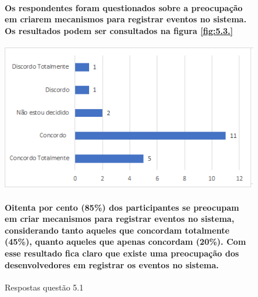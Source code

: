 \begin{figure}[!t]
\centering
\paragraph{Os respondentes foram questionados sobre a preocupação em criarem mecanismos para registrar eventos no sistema. Os resultados podem ser consultados na figura \ref{fig:5.3.}}
\includegraphics[scale=0.7]{figuras das questoes/5.1.png}
\caption{Respostas questão 5.1}
\paragraph{Oitenta por cento (85{\%}) dos participantes se preocupam em criar mecanismos para registrar eventos no sistema, considerando tanto aqueles que concordam totalmente (45{\%}), quanto aqueles que apenas concordam (20{\%}). Com esse resultado fica claro que existe uma preocupação dos desenvolvedores em registrar os eventos no sistema.}
\label{fig:5.1}
\end{figure}


